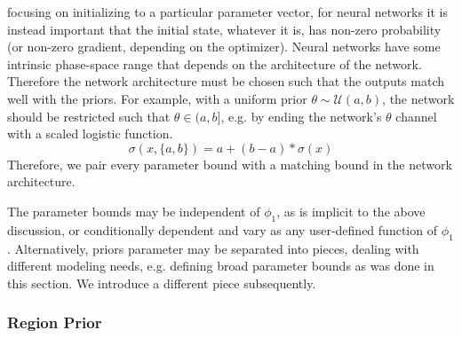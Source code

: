 \documentclass[twocolumn]{aastex631}
\newcommand{\mcal}[1]{\mathcal{#1}}
\begin{document}
            focusing on initializing to a particular parameter vector, for neural networks it is instead important that the initial state, whatever it is, has non-zero probability (or non-zero gradient, depending on the optimizer).
            Neural networks have some intrinsic phase-space range that depends on the architecture of the network. Therefore the network architecture must be chosen such that the outputs match well with the priors. For example, with a
            uniform prior $\theta \sim \mcal{U}(a,b)$, the network should be restricted such that $\theta \in (a, b]$, e.g. by ending the network's $\theta$ channel with a scaled logistic function.
            \begin{equation}\label{eq:scaled_logistic}
                  \sigma(x, \{a,b\}) = a + (b - a) * \sigma(x)
            \end{equation}
            Therefore, we pair every parameter bound with a matching bound in the network architecture.

            The parameter bounds may be independent of $\phi_1$, as is implicit to the above discussion, or conditionally dependent and vary as any user-defined function of $\phi_1$.
            Alternatively, priors parameter may be separated into pieces, dealing with different modeling needs, e.g. defining broad parameter bounds as was done in this section.
            We introduce a different piece subsequently.


        \subsubsection{Region Prior} \label{sub:track_region_prior}
\end{document}
